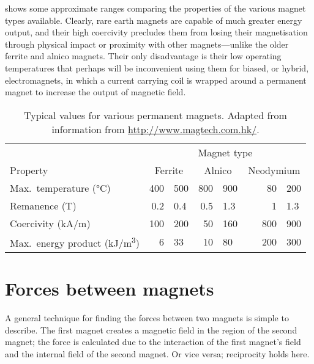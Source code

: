  shows some approximate ranges comparing the
properties of the various magnet types available. Clearly, rare earth
magnets are capable of much greater energy output, and their high
coercivity precludes them from losing their magnetisation through
physical impact or proximity with other magnets---unlike the older
ferrite and alnico magnets. Their only disadvantage is their low
operating temperatures that perhaps will be inconvenient using them
for biased, or hybrid, electromagnets, in which a current carrying
coil is wrapped around a permanent magnet to increase the output of
magnetic field.

\begin{table}
  \centering
  \begin{tabular}{@{} l r@{\,--\,}l r@{\,--\,}l r@{\,--\,}l @{}}
    \toprule
    & \multicolumn{6}{c}{Magnet type}\\
    \cmidrule{2-6}
    Property            & \multicolumn{2}{c}{Ferrite}
                        & \multicolumn{2}{c}{Alnico}
                        & \multicolumn{2}{c}{Neodymium}  \\
    \midrule
    Max.\ temperature (°C)    & \num{400} & \num{500} & \num{800} & \num{900} &    \num{ 80} & \num{200}  \\
    Remanence (T)             & \num{0.2} & \num{0.4} & \num{0.5} & \num{1.3} &    \num{  1} & \num{1.3}  \\
    Coercivity (\si{kA/m})    & \num{100} & \num{200} & \num{50 } & \num{160} & ~~~\num{800} & \num{900}  \\
    Max.\ energy product
               (\si{kJ/m^3})  & \num{6}   & \num{33}  & \num{10}  & \num{80}  &    \num{200} & \num{300}  \\
    \bottomrule
  \end{tabular}
  \caption[Typical values for various permanent magnets.]
  {Typical values for various permanent magnets.
   Adapted from information from \url{http://www.magtech.com.hk/}.}
\end{table}


\section{Forces between magnets}


\textcite{bassani2006}

A general technique for finding the forces between two magnets is
simple to describe. The first magnet creates a magnetic field in the
region of the second magnet; the force is calculated due to the
interaction of the first magnet's field and the internal field of the
second magnet. Or vice versa; reciprocity holds here.

